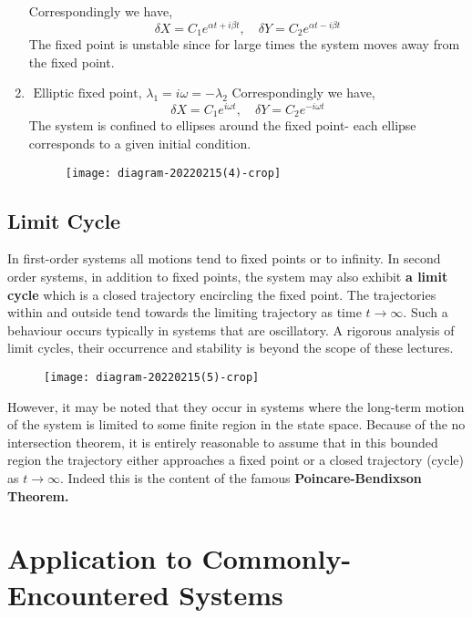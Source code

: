 \begin{enumerate}
	Correspondingly we have,
	$$
	\delta X=C_{1} e^{\alpha t+i \beta t}, \quad \delta Y=C_{2} e^{\alpha t-i \beta t}
	$$
	The fixed point is unstable since for large times the system moves away from the fixed point.
	\item \textbf{$\text { Elliptic fixed point, } \lambda_{1}=i \omega=-\lambda_{2}$}
 Correspondingly we have,\\
 $$\delta X=C_{1} e^{i \omega t}, \quad \delta Y=C_{2} e^{-i \omega t}$$
 The system is confined to ellipses around the fixed point- each ellipse corresponds to a given initial condition.\\
 \begin{figure}[H]
 	\centering
 	\texttt{[image: diagram-20220215(4)-crop]}
 	\caption{}
 	\label{}
 \end{figure}
\end{enumerate}
\subsection{Limit Cycle}
In first-order systems all motions tend to fixed points or to infinity. In second order systems, in addition to fixed points, the system may also exhibit \textbf{a limit cycle} which is a closed trajectory encircling the fixed point. The trajectories within and outside tend towards the limiting trajectory as time $t \rightarrow \infty .$ Such a behaviour occurs typically in systems that are oscillatory. A rigorous analysis of limit cycles, their occurrence and stability is beyond the scope of these lectures.\\
\begin{figure}[H]
	\centering
	\texttt{[image: diagram-20220215(5)-crop]}
	\caption{}
	\label{}
\end{figure}
 However, it may be noted that they occur in systems where the long-term motion of the system is limited to some finite region in the state space. Because of the no intersection theorem, it is entirely reasonable to assume that in this bounded region the trajectory either approaches a fixed point or a closed trajectory (cycle) as $t \rightarrow \infty$. Indeed this is the content of the famous \textbf{Poincare-Bendixson Theorem.}
\section{Application to Commonly-Encountered Systems}
